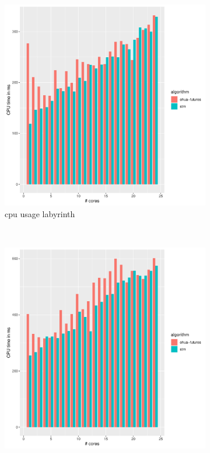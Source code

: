 \begin{figure}
    \begin{subfigure}[t]{.32\textwidth}
        \includegraphics[width=\textwidth,keepaspectratio]{gfx/results/labyrinth/labyrinth_cpu}
        \caption{cpu usage labyrinth}%
    \end{subfigure}%
    ~
    \begin{subfigure}[t]{.32\textwidth}
        \includegraphics[width=\textwidth,keepaspectratio]{gfx/results/labyrinth/labyrinth+_cpu}

\end{subfigure}
\end{figure}
